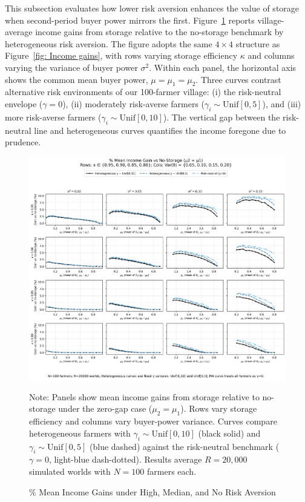 This subsection evaluates how lower risk aversion enhances the value of storage when second-period buyer power mirrors the first. Figure~\ref{fig: Income gains with RN case} reports village-average income gains from storage relative to the no-storage benchmark by heterogeneous risk aversion. The figure adopts the same $4\times4$ structure as Figure~\ref{fig: Income gains}, with rows varying storage efficiency $\kappa$ and columns varying the variance of buyer power $\sigma^2$. Within each panel, the horizontal axis shows the common mean buyer power, $\mu=\mu_1=\mu_2$. Three curves contrast alternative risk environments of our 100-farmer village: (i) the risk-neutral envelope ($\gamma=0$), (ii) moderately risk-averse farmers ($\gamma_i\sim \mathrm{Unif}[0,5]$), and (iii) more risk-averse farmers ($\gamma_i\sim \mathrm{Unif}[0,10]$). The vertical gap between the risk-neutral line and heterogeneous curves quantifies the income foregone due to prudence.

\begin{figure}[ht]
    \centering
    \includegraphics[width=\linewidth]{model_figures/gainpct_grid_4x4_zero_gap_three_curves.png}
    \caption{$\%$ Mean Income Gains under High, Median, and No Risk Aversion}
    \label{fig: Income gains with RN case}
    \begin{tablenotes}
    \footnotesize
    \item Note: Panels show mean income gains from storage relative to no-storage under the zero-gap case ($\mu_2=\mu_1$). Rows vary storage efficiency and columns vary buyer-power variance. Curves compare heterogeneous farmers with $\gamma_i \sim \text{Unif}[0,10]$ (black solid) and $\gamma_i \sim \text{Unif}[0,5]$ (blue dashed) against the risk-neutral benchmark ($\gamma=0$, light-blue dash-dotted). Results average $R=20{,}000$ simulated worlds with $N=100$ farmers each.
    \end{tablenotes}
\end{figure}

